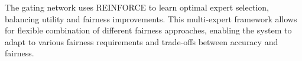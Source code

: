 \documentclass[11pt]{article}
\begin{document}
The gating network uses REINFORCE to learn optimal expert selection, balancing utility and fairness improvements. This multi-expert framework allows for flexible combination of different fairness approaches, enabling the system to adapt to various fairness requirements and trade-offs between accuracy and fairness.
\end{document}
